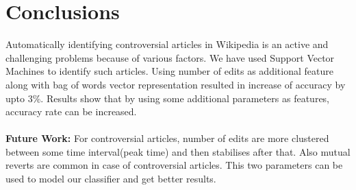 \documentclass[twocolumn]{article}
\begin{document}
 \section{Conclusions}

 Automatically identifying controversial articles in Wikipedia 
 is an active and challenging problems because of various factors. 
 We have used Support Vector Machines to identify such articles. 
 Using number of edits as additional feature along with bag of 
 words vector representation resulted in increase of accuracy by 
 upto 3\%. Results show that by using some additional parameters 
 as features, accuracy rate can be increased.\\ \\
 \textbf{Future Work: }For controversial articles, number of edits 
 are more clustered between some time interval(peak time) and then 
 stabilises after that. Also mutual reverts are common in case of 
 controversial articles. This two parameters can be used to model 
 our classifier and get better results.

 
 

 
\end{document}
